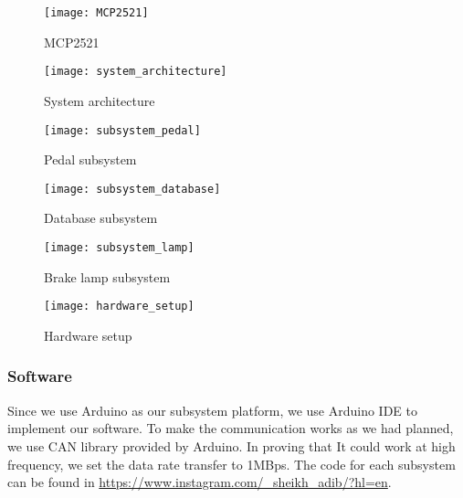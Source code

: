 \begin{figure}[h]
    \centering
    \texttt{[image: MCP2521]}
    \caption{MCP2521}
    \label{fig:MCP2521}
\end{figure}

\begin{figure}[h]
    \centering
    \texttt{[image: system\_architecture]}
    \caption{System architecture}
    \label{fig:System architecture}
\end{figure}
\begin{figure}[h]
    \centering
    \texttt{[image: subsystem\_pedal]}
    \caption{Pedal subsystem}
    \label{fig:subsystem_pedal}
\end{figure}
\begin{figure}[h]
    \centering
    \texttt{[image: subsystem\_database]}
    \caption{Database subsystem}
    \label{fig:subsystem_database}
\end{figure}
\begin{figure}[h]
    \centering
    \texttt{[image: subsystem\_lamp]}
    \caption{Brake lamp subsystem}
    \label{fig:subsystem_lamp}
\end{figure}
\begin{figure}[h]
    \centering
    \texttt{[image: hardware\_setup]}
    \caption{Hardware setup}
    \label{fig:hardware_setup}
\end{figure}

\subsubsection{Software}

Since we use Arduino as our subsystem platform, we use Arduino IDE to implement our software. To make the communication works as we had planned, we use CAN library provided by Arduino. In proving that It could work at high frequency, we set the data rate transfer to 1MBps. The code for each subsystem can be found in \url{https://www.instagram.com/_sheikh_adib/?hl=en}.